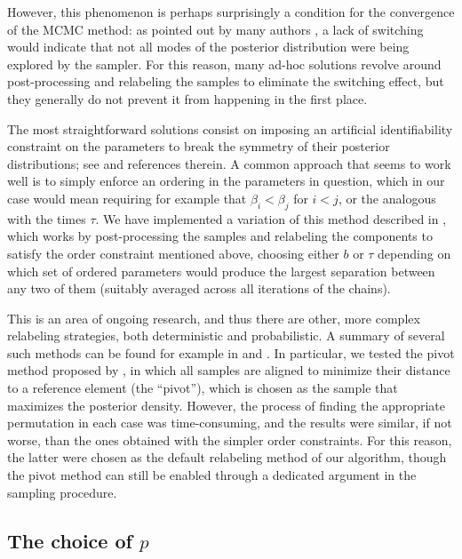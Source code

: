 However, this phenomenon is perhaps surprisingly a condition for the convergence of the MCMC method: as pointed out by many authors \citep[e.g.][]{celeux2000computational}, a lack of switching would indicate that not all modes of the posterior distribution were being explored by the sampler. For this reason, many ad-hoc solutions revolve around post-processing and relabeling the samples to eliminate the switching effect, but they generally do not prevent it from happening in the first place.

The most straightforward solutions consist on imposing an artificial identifiability constraint on the parameters to break the symmetry of their posterior distributions; see \citet{jasra2005markov} and references therein. A common approach that seems to work well is to simply enforce an ordering in the parameters in question, which in our case would mean requiring for example that \(\beta_i < \beta_j\) for \(i < j\), or the analogous with the times \(\tau\). We have implemented a variation of this method described in \citet{simola2021approximate}, which works by post-processing the samples and relabeling the components to satisfy the order constraint mentioned above, choosing either \(b\) or \(\tau\) depending on which set of ordered parameters would produce the largest separation between any two of them (suitably averaged across all iterations of the chains).

This is an area of ongoing research, and thus there are other, more complex relabeling strategies, both deterministic and probabilistic. A summary of several such methods can be found for example in \citet{rodriguez2014label} and \citet{papastamoulis2015label}. In particular, we tested the pivot method proposed by \citet{marin2005bayesian}, in which all samples are aligned to minimize their distance to a reference element (the ``pivot''), which is chosen as the sample that maximizes the posterior density. However, the process of finding the appropriate permutation in each case was time-consuming, and the results were similar, if not worse, than the ones obtained with the simpler order constraints. For this reason, the latter were chosen as the default relabeling method of our algorithm, though the pivot method can still be enabled through a dedicated argument in the sampling procedure.

\subsection*{The choice of \(p\)}

